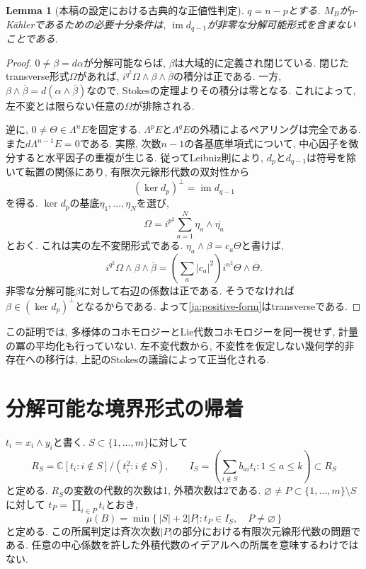 \documentclass[12pt]{amsart}
\newcommand{\lemword}{Lemma}
\newtheorem{lem}[thm]{\lemword}
\theoremstyle{definition}
\theoremstyle{remark}
\numberwithin{equation}{section}
\newcommand{\C}{\mathbb{C}}
\begin{document}
\begin{lem}[本稿の設定における古典的な正値性判定]
\label{ja:positivity}
$q=n-p$とする. $M_B$が$p$-K\"ahlerであるための必要十分条件は,
$\operatorname{im}d_{q-1}$が非零な分解可能形式を含まないことである.
\end{lem}
\begin{proof}
$0\ne\beta=d\alpha$が分解可能ならば, $\beta$は大域的に定義され閉じている.
閉じたtransverse形式$\Omega$があれば,
$i^{q^2}\Omega\wedge\beta\wedge\overline\beta$の積分は正である.
一方, $\beta\wedge\overline\beta=d(\alpha\wedge\overline\beta)$なので,
Stokesの定理よりその積分は零となる.
これによって, 左不変とは限らない任意の$\Omega$が排除される.

逆に, $0\ne\Theta\in\Lambda^nE$を固定する.
$\Lambda^pE$と$\Lambda^qE$の外積によるペアリングは完全である.
また$d\Lambda^{n-1}E=0$である. 実際, 次数$n-1$の各基底単項式について,
中心因子を微分すると水平因子の重複が生じる.
従ってLeibniz則により, $d_p$と$d_{q-1}$は符号を除いて転置の関係にあり,
有限次元線形代数の双対性から
\[
 (\ker d_p)^\perp=\operatorname{im}d_{q-1}
\]
を得る. $\ker d_p$の基底$\eta_1,\ldots,\eta_N$を選び,
\begin{equation}\label{ja:positive-form}
 \Omega=i^{p^2}\sum_{a=1}^N\eta_a\wedge\overline{\eta_a}
\end{equation}
とおく. これは実の左不変閉形式である.
$\eta_a\wedge\beta=c_a\Theta$と書けば,
\[
 i^{q^2}\Omega\wedge\beta\wedge\overline\beta
 =\left(\sum_a|c_a|^2\right)i^{n^2}\Theta\wedge\overline\Theta.
\]
非零な分解可能$\beta$に対して右辺の係数は正である.
そうでなければ$\beta\in(\ker d_p)^\perp$となるからである.
よって\eqref{ja:positive-form}はtransverseである.
\end{proof}

この証明では, 多様体のコホモロジーとLie代数コホモロジーを同一視せず,
計量の冪の平均化も行っていない.
左不変代数から, 不変性を仮定しない幾何学的非存在への移行は,
上記のStokesの議論によって正当化される.

\section{分解可能な境界形式の帰着}\label{ja:boundary-section}
$t_i=x_i\wedge y_i$と書く.
$S\subset\{1,\ldots,m\}$に対して
\[
 R_S=\C[t_i:i\notin S]/(t_i^2:i\notin S),\qquad
 I_S=\left(\sum_{i\notin S}b_{ai}t_i:1\leq a\leq k\right)\subset R_S
\]
と定める. $R_S$の変数の代数的次数は1, 外積次数は2である.
$\varnothing\ne P\subset\{1,\ldots,m\}\setminus S$に対して
$t_P=\prod_{i\in P}t_i$とおき,
\begin{equation}\label{ja:mu}
 \mu(B)=\min\{\,|S|+2|P|:t_P\in I_S,\quad P\ne\varnothing\,\}
\end{equation}
と定める. この所属判定は斉次次数$|P|$の部分における有限次元線形代数の問題である.
任意の中心係数を許した外積代数のイデアルへの所属を意味するわけではない.
\end{document}
